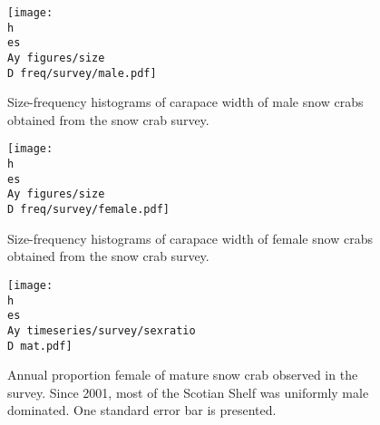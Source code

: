 \documentclass[11pt]{article}
\newcommand{\D}{.}
\newcommand{\h}{C:/} %
\newcommand{\es}{bio.data/bio.snowcrab/} %
\newcommand{\Ay}{assessments/2017/}
\begin{document}



\begin{figure}
\centering
	\texttt{[image: \\h \\es \\Ay figures/size\\D freq/survey/male.pdf]}\\ 
\caption{Size-frequency histograms of carapace width of male snow crabs obtained from the snow crab survey.  }
\end{figure}
\clearpage



\begin{figure}
\centering
	\texttt{[image: \\h \\es \\Ay figures/size\\D freq/survey/female.pdf]}\\ 
\caption{ Size-frequency histograms of carapace width of female snow crabs obtained from the snow crab survey. }
\end{figure}
\clearpage


\begin{figure}
\centering
	\texttt{[image: \\h \\es \\Ay timeseries/survey/sexratio\\D mat.pdf]}\\ 
\caption{ Annual proportion female of mature snow crab observed in the survey. Since 2001, most of the Scotian Shelf was uniformly male dominated. One standard error bar is presented.}
\end{figure}
\clearpage


\end{document}
